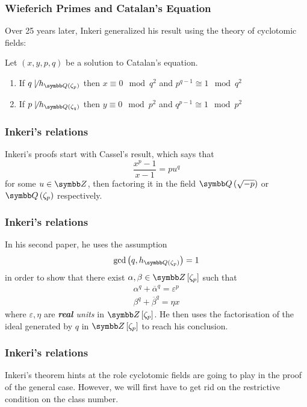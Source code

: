 \begin{frame}
\frametitle{Wieferich Primes and Catalan's Equation}
Over 25 years later, Inkeri generalized \cite{Inkeri1990} his result using the theory of cyclotomic fields:
\begin{theorem}[Inkeri, 1990]
Let \(\left(x, y, p, q\right)\) be a solution to Catalan's equation.
\begin{enumerate}
    \item If \(q \notdivides h_{\rationals\left(\zeta_p\right)}\) then \(x \equiv 0 \mod{q^2}\) and \(p^{q - 1} \cong 1 \mod{q^2}\)
    \item If \(p \notdivides h_{\rationals\left(\zeta_q\right)}\) then \(y \equiv 0 \mod{p^2}\) and \(q^{p - 1} \cong 1 \mod{p^2}\)
\end{enumerate}
\end{theorem}
\end{frame}

\begin{frame}
\frametitle{Inkeri's relations}

Inkeri's proofs start with Cassel's result, which says that
\[
    \frac{x^p - 1}{x - 1} = p u^q
\]
for some \(u \in \integers\), then factoring it in the field \(\rationals\left(\sqrt{-p}\right)\) or \(\rationals\left(\zeta_p\right)\) respectively.
\end{frame}

\begin{frame}
\frametitle{Inkeri's relations}

In his second paper, he uses the assumption
\[
    \gcd \left(q, h_{\rationals\left(\zeta_p\right)}\right) = 1
\]
in order to show that there exist \(\alpha, \beta \in \integers\left[\zeta_p\right]\) such that
\begin{align*}    
    \alpha^q + \overline{\alpha}^q = \varepsilon^p \\
    \beta^q + \overline{\beta}^q = \eta x
\end{align*}
where \(\varepsilon, \eta\) are \emph{\textbf{real} units} in \(\integers\left[\zeta_p\right]\). He then uses the factorisation of the ideal generated by \(q\) in \(\integers\left[\zeta_p\right]\) to reach his conclusion.
\end{frame}

\begin{frame}
\frametitle{Inkeri's relations}

Inkeri's theorem hints at the role cyclotomic fields are going to play in the proof of the general case. However, we will first have to get rid on the restrictive condition on the class number.
\end{frame}
